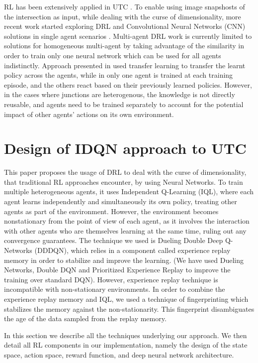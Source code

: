 \documentclass{llncs}
\begin{document}
RL has been extensively applied in UTC \cite{Chu2017,Dusparic2016,El-Tantawy2012,Tahifa2015}. To enable using image snapshosts of the intersection as input, while dealing with the curse of dimensionality, more recent work started exploring DRL and Convolutional Neural Networks (CNN) solutions in single agent scenarios \cite{Mousavi2017,Liang2018}. Multi-agent DRL work is currently limited to solutions for homogeneous multi-agent by taking advantage of the similarity in order to train only one neural network which can be used for all agents indistinctly. Approach presented in \cite{VanDerPol2016} used transfer learning to transfer the learnt policy across the agents, while in \cite{Liu2017CooperativeDR} only one agent is trained at each training episode, and the others react based on their previously learned policies. However, in the cases where junctions are heterogenous, the knowledge is not directly reusable, and agents need to be trained separately to account for the potential impact of other agents' actions on its own environment.

\section{Design of IDQN approach to UTC} \label{design}

This paper proposes the usage of DRL to deal with the curse of dimensionality, that traditional RL approaches encounter, by using Neural Networks. To train multiple heterogeneous agents, it uses Independent Q-Learning (IQL), where each agent learns independently and simultaneously its own policy, treating other agents as part of the environment. However, the environment becomes nonstationary from the point of view of each agent, as it involves the interaction with other agents who are themselves learning at the same time, ruling out any convergence guarantees. The technique we used is Dueling Double Deep Q-Networks (DDDQN), which relies in a component called experience replay memory in order to stabilize and improve the learning. (We have used Dueling Networks, Double DQN and Prioritized Experience Replay to improve the training over standard DQN). However, experience replay technique is incompatible with non-stationary environments. In order to combine the experience replay memory and IQL, we used a technique of fingerprinting which stabilizes the memory against the non-stationarity. This fingerprint disambiguates the age of the data sampled from the replay memory. 

In this section we describe all the techniques underlying our approach. We then detail all RL components in our implementation, namely the design of the state space, action space, reward function, and deep neural network architecture. 
\end{document}
